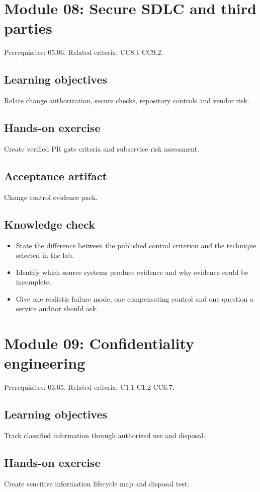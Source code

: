 \documentclass[10pt,oneside]{report}
\begin{document}
\section{Module 08: Secure SDLC and third parties}
Prerequisites: 05,06. Related criteria: CC8.1 CC9.2.

\subsection{Learning objectives}
Relate change authorization, secure checks, repository controls and vendor risk.

\subsection{Hands-on exercise}
Create verified PR gate criteria and subservice risk assessment.

\subsection{Acceptance artifact}
Change control evidence pack.

\subsection{Knowledge check}
\begin{itemize}
\item State the difference between the published control criterion and the technique selected in the lab.
\item Identify which source systems produce evidence and why evidence could be incomplete.
\item Give one realistic failure mode, one compensating control and one question a service auditor should ask.
\end{itemize}

\section{Module 09: Confidentiality engineering}
Prerequisites: 03,05. Related criteria: C1.1 C1.2 CC6.7.

\subsection{Learning objectives}
Track classified information through authorized use and disposal.

\subsection{Hands-on exercise}
Create sensitive information lifecycle map and disposal test.
\end{document}

